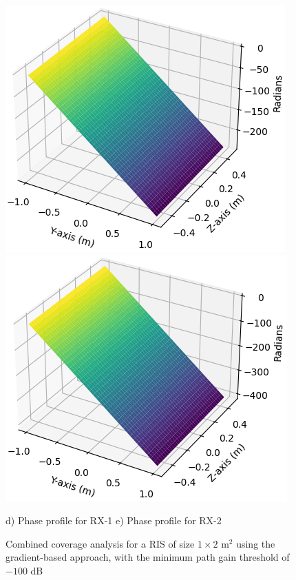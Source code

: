 \documentclass{IEEEoj}
\begin{document}
\begin{figure}
	\includegraphics[width=0.48\linewidth]{Sim_Results/pp_-100dB_gradient_RX1.png}
	\hfill
	\includegraphics[width=0.48\linewidth]{Sim_Results/pp_-100dB_gradient_RX2.png}
	
	\hspace{10pt} d) Phase profile for RX-1 \hspace{15pt} e) Phase profile for RX-2
	\caption{Combined coverage analysis for a RIS of size $1 \times 2$ m$^2$ using the gradient-based approach, with the minimum path gain threshold of $-100$ dB}
	\label{comb_cov_gradient}
\end{figure}
\end{document}
